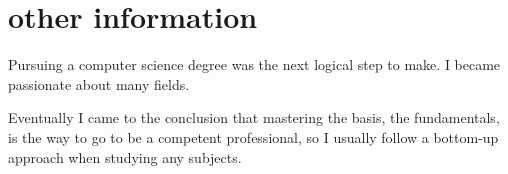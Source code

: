 \documentclass[]{../document-class/twentysecondcv}
\begin{document}
\section{other information}

Pursuing a computer science degree was the next logical step to make. I became passionate about many fields.

Eventually I came to the conclusion that mastering the basis, the fundamentals, is the way to go to be a competent professional, so I usually follow a bottom-up approach when studying any subjects.
\end{document}
